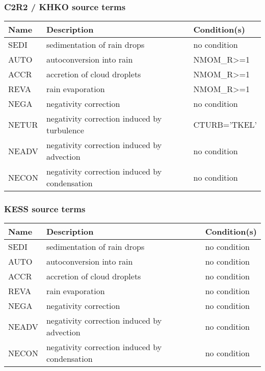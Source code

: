\subsubsection{C2R2 / KHKO source terms}

\begin{longtable} {|p{}|p{}|p{}|}
\hline
Name & Description & Condition(s) \\
\hline \hline
\endhead
SEDI   & sedimentation of rain drops                   & no condition \\\hline
AUTO   & autoconversion into rain                      & NMOM\_R>=1 \\\hline
ACCR   & accretion of cloud droplets                   & NMOM\_R>=1 \\\hline
REVA   & rain evaporation                              & NMOM\_R>=1 \\\hline
NEGA   & negativity correction                         & no condition \\\hline
NETUR  & negativity correction induced by turbulence   & CTURB='TKEL' \\\hline
NEADV  & negativity correction induced by advection    & no condition \\\hline
NECON  & negativity correction induced by condensation & no condition \\\hline
\end{longtable}

\subsubsection{KESS source terms}

\begin{longtable} {|p{}|p{}|p{}|}
\hline
Name & Description & Condition(s) \\
\hline \hline
\endhead
SEDI   & sedimentation of rain drops                   & no condition \\\hline
AUTO   & autoconversion into rain                      & no condition \\\hline
ACCR   & accretion of cloud droplets                   & no condition \\\hline
REVA   & rain evaporation                              & no condition \\\hline
NEGA   & negativity correction                         & no condition \\\hline
NEADV  & negativity correction induced by advection    & no condition \\\hline
NECON  & negativity correction induced by condensation & no condition \\\hline
\end{longtable}


